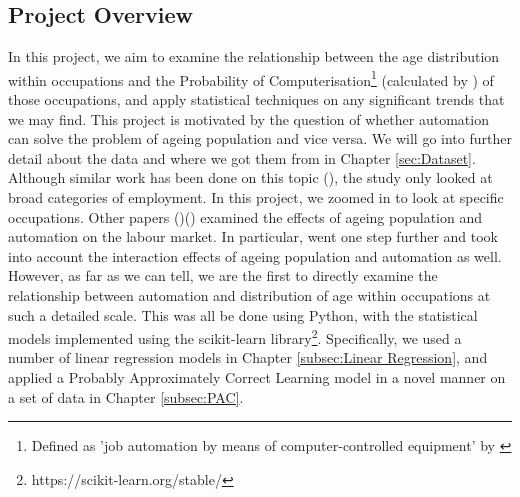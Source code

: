 \documentclass[11pt]{article}
\begin{document}
\subsection{Project Overview}
\label{subsec:projectoverview}
In this project, we aim to examine the relationship between the age distribution within occupations and the Probability of Computerisation\footnote{Defined as 'job automation by means of computer-controlled equipment' by \cite{osborne2017future}} (calculated by \cite{futureofemployment}) of those occupations, and apply statistical techniques on any significant trends that we may find. This project is motivated by the question of whether automation can solve the problem of ageing population and vice versa. We will go into further detail about the data and where we got them from in Chapter \ref{sec:Dataset}. Although similar work has been done on this topic (\cite{twinthreats}), the study only looked at broad categories of employment. In this project, we zoomed in to look at specific occupations. Other papers (\cite{10.1257/aer.p20171101})(\cite{10.1371/journal.pone.0263704}) examined the effects of ageing population and automation on the labour market. In particular, \cite{10.1371/journal.pone.0263704} went one step further and took into account the interaction effects of ageing population and automation as well. However, as far as we can tell, we are the first to directly examine the relationship between automation and distribution of age within occupations at such a detailed scale. This was all be done using Python, with the statistical models implemented using the scikit-learn library\footnote{https://scikit-learn.org/stable/}. Specifically, we used a number of linear regression models in Chapter \ref{subsec:Linear Regression}, and applied a Probably Approximately Correct Learning model in a novel manner on a set of data in Chapter \ref{subsec:PAC}.

\end{document}
